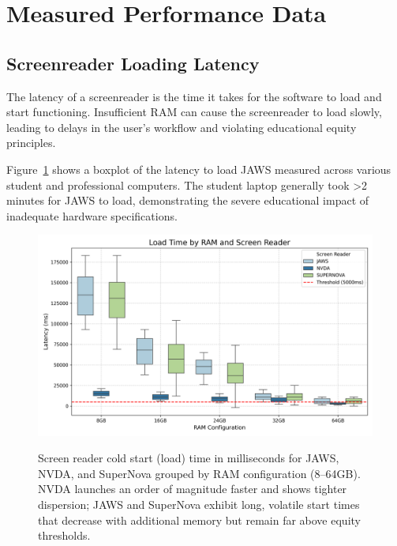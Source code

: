 \hypertarget{measured-performance-data}{}\section{Measured Performance Data}\label{measured-performance-data}

\subsection{Screenreader Loading Latency}\label{screenreader-loading-latency}

The latency of a screenreader is the time it takes for the software to load and start functioning. Insufficient RAM can cause the screenreader to load slowly, leading to delays in the user's workflow and violating educational equity principles.

Figure~\ref{fig:figure1} shows a boxplot of the latency to load JAWS measured across various student and professional computers. The student laptop generally took >2 minutes for JAWS to load, demonstrating the severe educational impact of inadequate hardware specifications.

\begin{figure}[htbp]


	\includegraphics[alt={Boxplots comparing initial load times (ms) for JAWS, NVDA, and SuperNova across 8GB,16GB,24GB,32GB,64GB RAM showing NVDA consistently fastest, JAWS/SuperNova high and variable with improvement at higher RAM.}]{images/load_time.png}
	\caption[Screen reader load time by RAM and product]{Screen reader cold start (load) time in milliseconds for JAWS, NVDA, and SuperNova grouped by RAM configuration (8–64GB). NVDA launches an order of magnitude faster and shows tighter dispersion; JAWS and SuperNova exhibit long, volatile start times that decrease with additional memory but remain far above equity thresholds.}\label{fig:figure1}
	\tagstructend
\end{figure}


